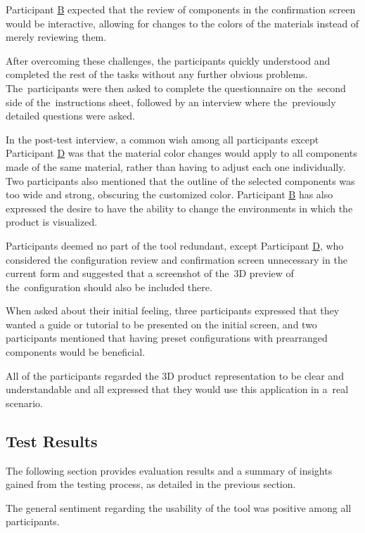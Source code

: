 Participant \hyperref[itm:B]{B} expected that the review of components in the confirmation screen would be interactive, allowing for changes to the colors of the materials instead of merely reviewing them.

After overcoming these challenges, the participants quickly understood and completed the rest of the tasks without any further obvious problems. The~participants were then asked to complete the  questionnaire on the~second side of the~instructions sheet, followed by an interview where the~previously detailed questions were asked.

In the post-test interview, a common wish among all participants except Participant \hyperref[itm:D]{D} was that the material color changes would apply to all components made of the same material, rather than having to adjust each one individually. Two participants also mentioned that the outline of the selected components was too wide and strong, obscuring the customized color. Participant \hyperref[itm:B]{B} has also expressed the desire to have the ability to change the environments in which the product is visualized.

Participants deemed no part of the tool redundant, except Participant \hyperref[itm:D]{D}, who considered the configuration review and confirmation screen unnecessary in the current form and suggested that a screenshot of the~3D preview of the~configuration should also be included there.

When asked about their initial feeling, three participants expressed that they wanted a guide or tutorial to be presented on the initial screen, and two participants mentioned that having preset configurations with prearranged components would be beneficial.  

All of the participants regarded the 3D product representation to be clear and understandable and all expressed that they would use this application in a~real scenario.


\subsection{Test Results}

The following section provides evaluation results and a summary of insights gained from the testing process, as detailed in the previous section.

The general sentiment regarding the usability of the tool was positive among all participants.

